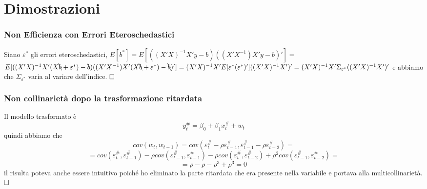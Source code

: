 \documentclass[a4page, 11pt]{article} %
\begin{document}
\part*{Dimostrazioni}
\section*{Non Efficienza con Errori Eteroschedastici}
Siano $\varepsilon^*$ gli errori eteroschedastici,  $E[b^*]=E[((X'X)^{-1}X'y-b)((X'X^{-1})X'y-b)'] =$\newline  $E[((X'X)^{-1}X'(X\bcancel{b}+\varepsilon^*)-\bcancel{b})((X'X^{-1})X'(X\bcancel{b}+\varepsilon^*)-\bcancel{b})'] = (X'X)^{-1}X'E[\varepsilon^* (\varepsilon^*)']((X'X)^{-1}X')' = \newline (X'X)^{-1}X' \Sigma_{\varepsilon^*}((X'X)^{-1}X')'$ e abbiamo che $\Sigma_{\varepsilon^*}$ varia al variare dell'indice. $ \hfill \square$

\section*{Non collinarietà dopo la trasformazione ritardata}
Il modello trasformato è 
\[y^{\#}_t = \beta_{0} + \beta_1x_t^{\#} + w_t \] 
quindi abbiamo che 
\[ cov(w_t,w_{t-1}) = cov(\varepsilon_t^{\#} - \rho \varepsilon_{t-1}^\#, \varepsilon_{t-1}^\# - \rho \varepsilon_{t-2}^\#) =  \]
\[ = cov(\varepsilon_{t}^\#,\varepsilon_{t-1}^\#) -\rho cov(\varepsilon_{t-1}^\#,\varepsilon_{t-1}^\#) - \rho cov(\varepsilon_{t}^\#,\varepsilon_{t-2}^\#) + \rho^2 cov(\varepsilon_{t-1}^\#,\varepsilon_{t-2}^\#) = \]
\[ = \rho - \rho - \rho^3 + \rho^3  = 0 \]
il risulta poteva anche essere intuitivo poiché ho eliminato la parte ritardata che era presente nella variabile e portava alla multicollinarietà. $\hfill \square$
\end{document}
